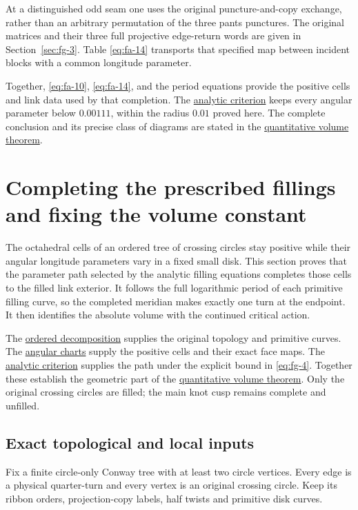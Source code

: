 At a distinguished odd seam one uses the original puncture-and-copy exchange, rather than an arbitrary permutation of the three pants punctures. The original matrices and their three full projective edge-return words are given in Section~\ref{sec:fg-3}. Table \eqref{eq:fa-14} transports that specified map between incident blocks with a common longitude parameter.

Together, \eqref{eq:fa-10}, \eqref{eq:fa-14}, and the period equations provide the positive cells and link data used by that completion. The \hyperref[sec:qe]{analytic criterion} keeps every angular parameter below \(0.00111\), within the radius \(0.01\) proved here. The complete conclusion and its precise class of diagrams are stated in the \hyperref[ch:quantitative-circle-trees]{quantitative volume theorem}.

\section{Completing the prescribed fillings and fixing the volume constant}\label{sec:fg}

The octahedral cells of an ordered tree of crossing circles stay positive while their angular longitude parameters vary in a fixed small disk. This section proves that the parameter path selected by the analytic filling equations completes those cells to the filled link exterior. It follows the full logarithmic period of each primitive filling curve, so the completed meridian makes exactly one turn at the endpoint. It then identifies the absolute volume with the continued critical action.

The \hyperref[sec:ft]{ordered decomposition} supplies the original topology and primitive curves. The \hyperref[sec:fa]{angular charts} supply the positive cells and their exact face maps. The \hyperref[sec:qe]{analytic criterion} supplies the path under the explicit bound in \eqref{eq:fg-4}. Together these establish the geometric part of the \hyperref[ch:quantitative-circle-trees]{quantitative volume theorem}. Only the original crossing circles are filled; the main knot cusp remains complete and unfilled.

\subsection{Exact topological and local inputs}\label{sec:fg-1}

Fix a finite circle-only Conway tree with at least two circle vertices. Every edge is a physical quarter-turn and every vertex is an original crossing circle. Keep its ribbon orders, projection-copy labels, half twists and primitive disk curves.


